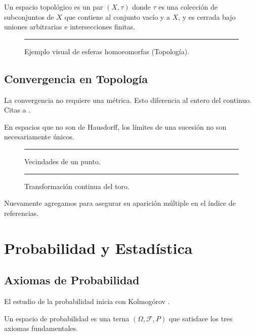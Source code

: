 	\begin{definition}
		Un espacio topológico es un par $(X, \tau)$ donde $\tau$ es una colección de subconjuntos de $X$ que contiene al conjunto vacío y a $X$, y es cerrada bajo uniones arbitrarias e intersecciones finitas.
	\end{definition}
	
	\begin{figure}[h]
		\centering
		\rule{6cm}{2cm}
		\caption{Ejemplo visual de esferas homoeomorfas (Topología).}
	\end{figure}
	
	\section{Convergencia en Topología}
	La \gls{convergencia} no requiere una métrica. Esto diferencia al \gls{entero} del continuo. Citas a \cite{spivak, ross}.
	
	\begin{nota}
		En espacios que no son de Hausdorff, los límites de una sucesión no son necesariamente únicos.
	\end{nota}
	
	\begin{figure}[h]
		\centering
		\rule{4cm}{4cm}
		\caption{Vecindades de un punto.}
	\end{figure}
	
	\begin{figure}[h]
		\centering
		\rule{7cm}{3cm}
		\caption{Transformación continua del toro.}
	\end{figure}
	
	Nuevamente agregamos \cite{strang} para asegurar su aparición múltiple en el índice de referencias.
	
	\chapter{Probabilidad y Estadística}
	
	\section{Axiomas de Probabilidad}
	El estudio de la \gls{probabilidad} inicia con Kolmogórov \cite{ross}. 
	
	\begin{definition}
		Un espacio de probabilidad es una terna $(\Omega, \mathcal{F}, P)$ que satisface los tres axiomas fundamentales.
	\end{definition}
	
